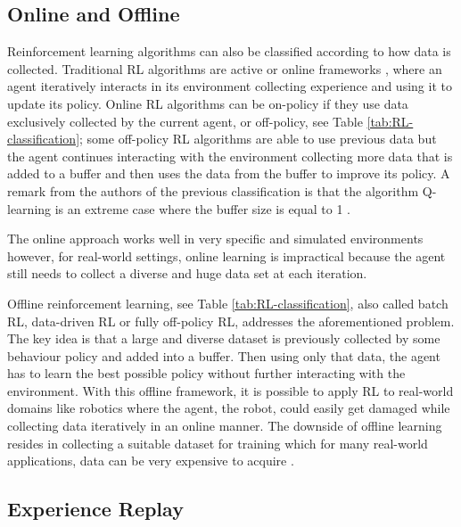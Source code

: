 \subsection{Online and Offline} 
\label{subsection:Online and Offline}

Reinforcement learning algorithms can also be classified according to how data is collected. Traditional RL algorithms are active or online frameworks \cite{youtube_offline_RL}, where an agent iteratively interacts in its environment collecting experience and using it to update its policy. Online RL algorithms can be on-policy if  they use data exclusively collected by the current agent, or off-policy, see Table \ref{tab:RL-classification}; some off-policy RL algorithms are able to use previous data but the agent continues interacting with the environment collecting more data that is added to a buffer and then uses the data from the buffer to improve its policy. A remark from the authors of the previous classification is that the algorithm Q-learning is an extreme case where the buffer size is  equal to 1 \cite{Offline-RL-Levine:2020}.

The online approach works well in very specific and  simulated environments however, for real-world settings, online learning is impractical because the agent still needs to collect a diverse and huge data set at each iteration. 

Offline reinforcement learning, see Table \ref{tab:RL-classification}, also called batch RL, data-driven RL or fully off-policy RL,  addresses the aforementioned problem. The key idea is that a large and diverse dataset is previously collected by some behaviour policy and added into a buffer. Then using only that data, the agent has to learn the best possible policy without further interacting with the environment. With this offline framework, it is possible to apply RL to real-world domains like robotics where the agent, the robot, could easily get damaged while collecting data iteratively in an online manner. The downside of offline learning resides in collecting a suitable dataset for training which for many real-world applications, data can be very expensive to acquire \cite{collecting_data_for_offline_learning}.







\subsection{Experience Replay}
\label{subsection:Experience Replay}

